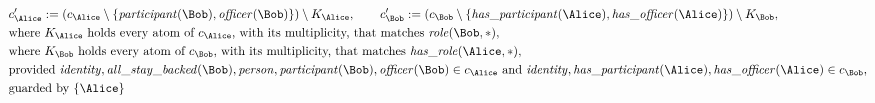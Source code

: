 \begin{align*}
&
c'_
{
\Alice
}
 := 
(c_
{
\Alice
}
 \setminus 
\{
\mathit{\detokenize{
participant
}}
(
\Bob
)
,
\mathit{\detokenize{
officer
}}
(
\Bob
)
\}
) \setminus K_
{
\Alice
}
, \qquad 
c'_
{
\Bob
}
 := 
(c_
{
\Bob
}
 \setminus 
\{
\mathit{\detokenize{
has_participant
}}
(
\Alice
)
,
\mathit{\detokenize{
has_officer
}}
(
\Alice
)
\}
) \setminus K_
{
\Bob
}
,\\
&
\text{where } K_
{
\Alice
}
 \text{ holds every atom of } c_
{
\Alice
}
 \text{, with its multiplicity, that matches } 
\mathit{\detokenize{
role
}}
(
\Bob
,
\ast
)
,\\
&
\text{where } K_
{
\Bob
}
 \text{ holds every atom of } c_
{
\Bob
}
 \text{, with its multiplicity, that matches } 
\mathit{\detokenize{
has_role
}}
(
\Alice
,
\ast
)
,\\
&
\text{provided } 
\mathit{\detokenize{
identity
}}
,
\mathit{\detokenize{
all_stay_backed
}}
(
\Bob
)
,
\mathit{\detokenize{
person
}}
,
\mathit{\detokenize{
participant
}}
(
\Bob
)
,
\mathit{\detokenize{
officer
}}
(
\Bob
)
 \in c_
{
\Alice
}
 \text{ and } 
\mathit{\detokenize{
identity
}}
,
\mathit{\detokenize{
has_participant
}}
(
\Alice
)
,
\mathit{\detokenize{
has_officer
}}
(
\Alice
)
 \in c_
{
\Bob
}
,\\
&
\text{guarded by } \{
\Alice
\}
\end{align*}


